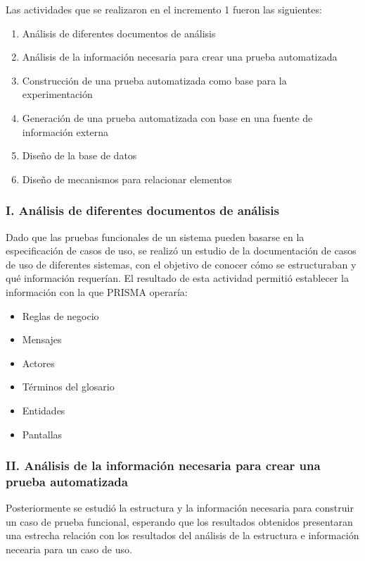 Las actividades que se realizaron en el incremento 1 fueron las siguientes:

{\small
\begin{enumerate}[label=\Roman*.]
	\item Análisis de diferentes documentos de análisis
	\item Análisis de la información necesaria para crear una prueba automatizada
	\item Construcción de una prueba automatizada como base para la experimentación
	\item Generación de una prueba automatizada con base en una fuente de información externa
	\item Diseño de la base de datos
	\item Diseño de mecanismos para relacionar elementos
\end{enumerate}
}	
	
\subsubsection*{I. Análisis de diferentes documentos de análisis}
	Dado que las pruebas funcionales de un sistema pueden basarse en la especificación de casos de uso, se realizó un estudio de la documentación de casos de uso de diferentes sistemas, con el objetivo de conocer cómo se estructuraban y qué información requerían. El resultado de esta actividad permitió establecer la información con la que PRISMA operaría:
	\begin{itemize}
		\item Reglas de negocio
		\item Mensajes
		\item Actores
		\item Términos del glosario
		\item Entidades
		\item Pantallas
	\end{itemize}
	
\subsubsection*{II. Análisis de la información necesaria para crear una prueba automatizada}
		
	Posteriormente se estudió la estructura y la información necesaria para construir un caso de prueba funcional, esperando que los resultados obtenidos presentaran una estrecha relación con los resultados del análisis de la estructura e información necearia para un caso de uso.\\
		
